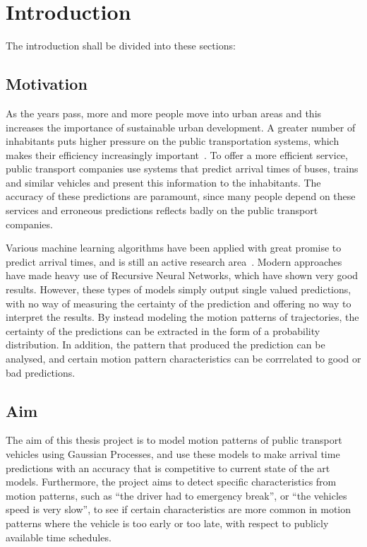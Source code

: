 \chapter{Introduction}
\label{cha:introduction}

The introduction shall be divided into these sections:

\section{Motivation}
\label{sec:motivation}
As the years pass, more and more people move into urban areas and this
increases the importance of sustainable urban development. A greater
number of inhabitants puts higher pressure on the public
transportation systems, which makes their efficiency increasingly
important~\cite{kondepudi2014smart}. To offer a more efficient
service, public transport companies use systems
that predict arrival times of buses, trains and similar vehicles
and present this information to the inhabitants. The accuracy of these predictions are paramount, 
since many people depend on these services and erroneous predictions reflects badly on the
public transport companies. 

Various machine learning algorithms have been applied with great
promise to predict arrival times, and is still an active research area~\cite{kim2017probabilistic, 
  pang2018learning, Nguyen2018Jun}. Modern approaches have made heavy
use of Recursive Neural Networks, which have shown very good results. 
However, these types of models simply output single valued predictions, with no way of
measuring the certainty of the prediction and offering no way to interpret the
results. By instead modeling the motion patterns of trajectories, the
certainty of the predictions can be extracted in the form of a
probability distribution. In addition, the pattern that produced the
prediction can be analysed, and certain motion pattern characteristics
can be corrrelated to good or bad predictions.

\section{Aim}
\label{sec:aim}

The aim of this thesis project is to model motion patterns of public
transport vehicles using Gaussian Processes, and use these
models to make arrival time predictions with an accuracy that is
competitive to current state of the art models. Furthermore, the project aims to
detect specific characteristics from motion patterns, such as ``the
driver had to emergency break'', or ``the vehicles speed is very slow'', to see if certain characteristics
are more common in motion patterns where the vehicle is too early or
too late, with respect to publicly available time schedules.


